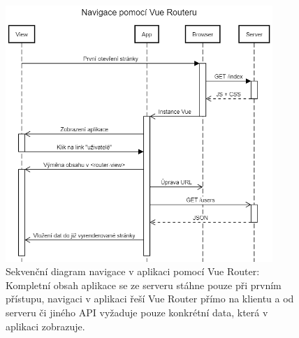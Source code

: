 \begin{figure}[h]
\includegraphics[width=0.9\textwidth]{../png/diagrams/sequence-vue-router.png}
\caption[Sekvenční diagram navigace v aplikaci pomocí Vue Router]{Sekvenční diagram navigace v aplikaci pomocí Vue Router: Kompletní obsah aplikace se ze serveru stáhne pouze při prvním přístupu, navigaci v aplikaci řeší Vue Router přímo na klientu a od serveru či jiného API vyžaduje pouze konkrétní data, která v aplikaci zobrazuje.} \label{picture:route:vue}
\end{figure}






% 
% 
% 
% 
% 

